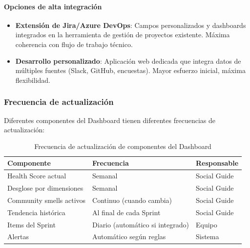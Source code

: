 \paragraph{Opciones de alta integración}

\begin{itemize}
    \item \textbf{Extensión de Jira/Azure DevOps}: Campos personalizados y dashboards integrados en la herramienta de gestión de proyectos existente. Máxima coherencia con flujo de trabajo técnico.

    \item \textbf{Desarrollo personalizado}: Aplicación web dedicada que integra datos de múltiples fuentes (Slack, GitHub, encuestas). Mayor esfuerzo inicial, máxima flexibilidad.
\end{itemize}

\subsubsection{Frecuencia de actualización}

Diferentes componentes del Dashboard tienen diferentes frecuencias de actualización:

\begin{table}[h]
    \centering
    \small
    \begin{tabularx}{\textwidth}{|l|X|l|}
        \hline
        \textbf{Componente}      & \textbf{Frecuencia}              & \textbf{Responsable} \\
        \hline
        Health Score actual      & Semanal                          & Social Guide         \\
        \hline
        Desglose por dimensiones & Semanal                          & Social Guide         \\
        \hline
        Community smells activos & Continuo (cuando cambia)         & Social Guide         \\
        \hline
        Tendencia histórica      & Al final de cada Sprint          & Social Guide         \\
        \hline
        Items del Sprint         & Diario (automático si integrado) & Equipo               \\
        \hline
        Alertas                  & Automático según reglas          & Sistema              \\
        \hline
    \end{tabularx}
    \caption{Frecuencia de actualización de componentes del Dashboard}
    \label{tab:frecuencia-dashboard}
\end{table}

